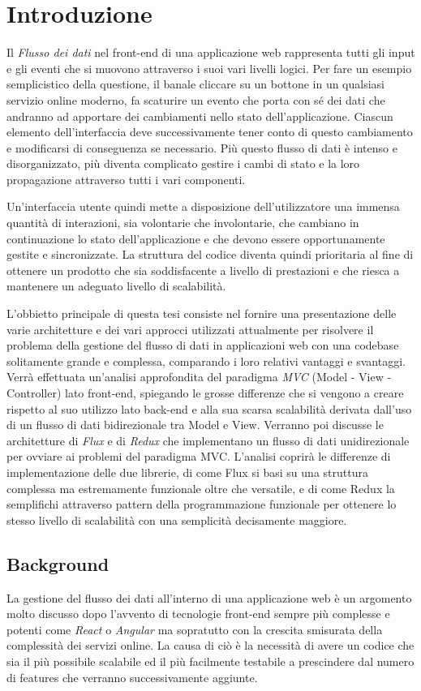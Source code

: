 \chapter{Introduzione}
Il \textit{Flusso dei dati} nel front-end di una applicazione web rappresenta tutti gli input e gli eventi che si muovono attraverso i suoi vari livelli logici. Per fare un esempio semplicistico della questione, il banale cliccare su un bottone in un qualsiasi servizio online moderno, fa scaturire un evento che porta con sé dei dati che andranno ad apportare dei cambiamenti nello stato dell'applicazione. Ciascun elemento dell'interfaccia deve successivamente tener conto di questo cambiamento e modificarsi di conseguenza se necessario. Più questo flusso di dati è intenso e disorganizzato, più diventa complicato gestire i cambi di stato e la loro propagazione attraverso tutti i vari componenti.

Un'interfaccia utente quindi mette a disposizione dell'utilizzatore una immensa quantità di interazioni, sia volontarie che involontarie, che cambiano in continuazione lo stato dell'applicazione e che devono essere opportunamente gestite e sincronizzate. La struttura del codice diventa quindi prioritaria al fine di ottenere un prodotto che sia soddisfacente a livello di prestazioni e che riesca a mantenere un adeguato livello di scalabilità.

L'obbietto principale di questa tesi consiste nel fornire una presentazione delle varie architetture e dei vari approcci utilizzati attualmente per risolvere il problema della gestione del flusso di dati in applicazioni web con una codebase solitamente grande e complessa, comparando i loro relativi vantaggi e svantaggi. Verrà effettuata un'analisi approfondita del paradigma \textit{MVC} (Model - View - Controller) lato front-end, spiegando le grosse differenze che si vengono a creare rispetto al suo utilizzo lato back-end e alla sua scarsa scalabilità derivata dall'uso di un flusso di dati bidirezionale tra Model e View. Verranno poi discusse le architetture di \textit{Flux} e di \textit{Redux} che implementano un flusso di dati unidirezionale per ovviare ai problemi del paradigma MVC.
L'analisi coprirà le differenze di implementazione delle due librerie, di come Flux si basi su una struttura complessa ma estremamente funzionale oltre che versatile, e di come Redux la semplifichi attraverso pattern della programmazione funzionale per ottenere lo stesso livello di scalabilità con una semplicità decisamente maggiore.

\section{Background}
La gestione del flusso dei dati all'interno di una applicazione web è un argomento molto discusso dopo l'avvento di tecnologie front-end sempre più complesse e potenti come \textit{React} o \textit{Angular} ma sopratutto con la crescita smisurata della complessità dei servizi online. La causa di ciò è la necessità di avere un codice che sia il più possibile scalabile ed il più facilmente testabile a prescindere dal numero di features che verranno successivamente aggiunte. 

